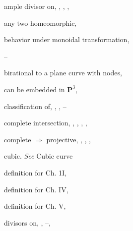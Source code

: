 {{\noindent\hspace*{7.5bp}ample divisor on, , , , \par
\noindent\hspace*{7.5bp}any two homeomorphic, \par
\noindent\hspace*{7.5bp}behavior under monoidal transformation,\par
\noindent\hspace*{15.0bp}--\par
\noindent\hspace*{7.5bp}birational to a plane curve with nodes,\par
\noindent\hspace*{15.0bp}\par
\noindent\hspace*{7.5bp}can be embedded in $\mathbf P^3$, \par
\noindent\hspace*{7.5bp}classification of, , , --\par
\noindent\hspace*{7.5bp}complete intersection, , , , ,\par
\noindent\hspace*{15.0bp}\par
\noindent\hspace*{7.5bp}complete $\Rightarrow$ projective, , , , \par
\noindent\hspace*{7.5bp}cubic. \emph{See} Cubic curve\par
\noindent\hspace*{7.5bp}definition for Ch. 1I, \par
\noindent\hspace*{7.5bp}definition for Ch. IV, \par
\noindent\hspace*{7.5bp}definition for Ch. V, \par
\noindent\hspace*{7.5bp}divisors on, , --, \par
}}
